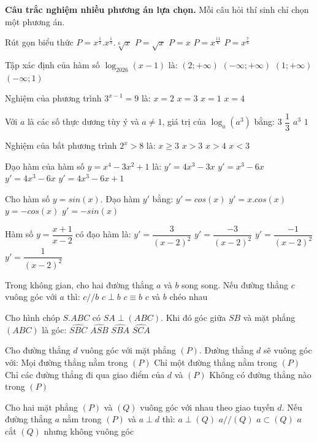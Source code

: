 \documentclass{article}
\begin{document}

\begin{khuvuc}{\textbf{Câu trắc nghiệm nhiều phương án lựa chọn.} Mỗi câu hỏi thí sinh chỉ chọn một phương án.}

    \CauTracNghiem
    {Rút gọn biểu thức $P=x^\frac{1}{2}.x^\frac{1}{3}.\sqrt[6]{x}$}
    {$P=\sqrt{x}$}
    {\Dung $P=x$}
    {$P=x^\frac{11}{6}$}
    {$P=x^\frac{7}{6}$}

    \CauTracNghiem
    {Tập xác định của hàm số $\log_{2026}{(x-1)}$ là:}
    {$\left(2;+\infty \right)$}
    {$\left(-\infty;+\infty \right)$}
    {\Dung $\left(1;+\infty \right)$}
    {$\left(-\infty;1 \right)$}

    \CauTracNghiem
    {Nghiệm của phương trình $3^{x-1}=9$ là:}
    {$x=2$}
    {\Dung $x=3$}
    {$x=1$}
    {$x=4$}

    \CauTracNghiem
    {Với $a$ là các số thực dương tùy ý và $a \neq 1$, giá trị của $\log_a(a^3)$ bằng:}
    {\Dung $3$}
    {$\dfrac{1}{3}$}
    {$a^3$}
    {$1$}

    \CauTracNghiem
    {Nghiệm của bất phương trình $2^x > 8$ là:}
    {$x\geq3$}
    {\Dung $x>3$}
    {$x>4$}
    {$x<3$}

    \CauTracNghiem
    {Đạo hàm của hàm số $y=x^4-3x^2+1$ là:}
    {$y'=4x^3-3x$}
    {$y'=x^3-6x$}
    {\Dung $y'=4x^3-6x$}
    {$y'=4x^3-6x+1$}

    \CauTracNghiem
    {Cho hàm số $y=sin(x)$. Đạo hàm $y'$ bằng: }
    {\Dung $y'=cos(x)$}
    {$y'=x.cos(x)$}
    {$y=-cos(x)$}
    {$y'=-sin(x)$}

    \CauTracNghiem
    {Hàm số $y=\dfrac{x+1}{x-2}$ có đạo hàm là: }
    {$y'=\dfrac{3}{(x-2)^2}$}
    {\Dung $y'=\dfrac{-3}{(x-2)^2}$}
    {$y'=\dfrac{-1}{(x-2)^2}$}
    {$y'=\dfrac{1}{(x-2)^2}$}

    \CauTracNghiem
    {Trong không gian, cho hai đường thẳng $a$ và $b$ song song. Nếu đường thẳng $c$ vuông góc với $a$ thì:}
    {$c // b$}
    {\Dung $c \perp b$}
    {$c \equiv b$}
    {$c$ và $b$ chéo nhau}

    \CauTracNghiem
    {Cho hình chóp $S.ABC$ có $SA \perp (ABC)$. Khi đó góc giữa $SB$ và mặt phẳng $(ABC)$ là góc:}
    {$\widehat{SBC}$}
    {$\widehat{ASB}$}
    {\Dung $\widehat{SBA}$}
    {$\widehat{SCA}$}

    \CauTracNghiem
    {Cho đường thẳng $d$ vuông góc với mặt phẳng $(P)$. Đường thẳng $d$ sẽ vuông góc với:}
    {\Dung Mọi đường thẳng nằm trong $(P)$}
    {Chỉ một đường thẳng nằm trong $(P)$}
    {Chỉ các đường thẳng đi qua giao điểm của $d$ và $(P)$}
    {Không có đường thẳng nào trong $(P)$}

    \CauTracNghiem
    {Cho hai mặt phẳng $(P)$ và $(Q)$ vuông góc với nhau theo giao tuyến $d$.
        Nếu đường thẳng $a$ nằm trong $(P)$ và $a \perp d$ thì:}
    {\Dung $a \perp (Q)$}
    {$a // (Q)$}
    {$a \subset (Q)$}
    {$a$ cắt $(Q)$ nhưng không vuông góc}

\end{khuvuc}
\end{document}
